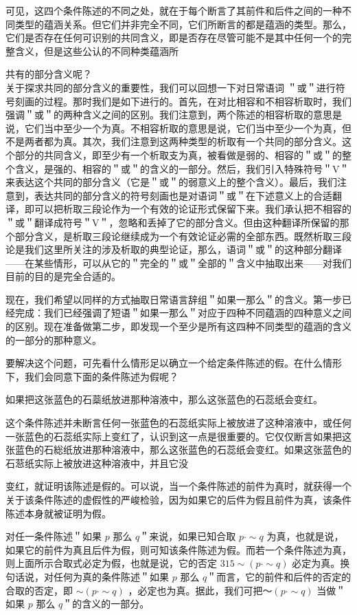 可见，这四个条件陈述的不同之处，就在于每个断言了其前件和后件之间的一种不同类型的蕴涵关系。但它们并非完全不同，它们所断言的都是蕴涵的类型。那么，它们是否存在任何可识别的共同含义，即是否存在尽管可能不是其中任何一个的完整含义，但是这些公认的不同种类蕴涵所

共有的部分含义呢？\\
关于探求共同的部分含义的重要性，我们可以回想一下对日常语词 ＂或＂进行符号刻画的过程。那时我们是如下进行的。首先，在对比相容和不相容析取时，我们强调＂或＂的两种含义之间的区别。我们注意到，两个陈述的相容析取的意思是说，它们当中至少一个为真。不相容析取的意思是说，它们当中至少一个为真，但不是两者都为真。其次，我们注意到这两种类型的析取有一个共同的部分含义。这个部分的共同含义，即至少有一个析取支为真，被看做是弱的、相容的＂或＂的整个含义，是强的、相容的＂或＂的含义的一部分。然后，我们引入特殊符号＂V＂来表达这个共同的部分含义（它是＂或＂的弱意义上的整个含义）。最后，我们注意到，表达共同的部分含义的符号刻画也是对语词＂或＂在下述意义上的合适翻译，即可以把析取三段论作为一个有效的论证形式保留下来。我们承认把不相容的＂或＂翻译成符号＂V＂，忽略和丢掉了它的部分含义。但由这种翻译所保留的那个部分含义，是析取三段论继续成为一个有效论证必需的全部东西。既然析取三段论是我们这里所关注的涉及析取的典型论证，那么，语词＂或＂的这种部分翻译——在某些情形，可以从它的＂完全的＂或＂全部的＂含义中抽取出来——对我们目前的目的是完全合适的。

现在，我们希望以同样的方式抽取日常语言辞组＂如果一那么＂的含义。第一步已经完成：我们已经强调了短语＂如果一那么＂对应于四种不同蕴涵的四种意义之间的区别。现在准备做第二步，即发现一个至少是所有这四种不同类型的蕴涵的含义的一部分的那种意义。

要解决这个问题，可先看什么情形足以确立一个给定条件陈述的假。在什么情形下，我们会同意下面的条件陈述为假呢？

\begin{displayquote}
如果把这张蓝色的石蘂纸放进那种溶液中，那么这张蓝色的石蕊纸会变红。
\end{displayquote}

这个条件陈述并未断言任何一张蓝色的石蕊纸实际上被放进了这种溶液中，或任何一张蓝色的石蕊纸实际上变红了，认识到这一点是很重要的。它仅仅断言如果把这张蓝色的石総纸放进那种溶液中，那么这张蓝色的石蕊纸会变红。如果这张蓝色的石䓗纸实际上被放进这种溶液中，并且它没

变红，就证明该陈述是假的。可以说，当一个条件陈述的前件为真时，就获得一个关于该条件陈述的虚假性的严峻检验，因为如果它的后件为假且前件为真，该条件陈述本身就被证明为假。

对任一条件陈述＂如果 $p$ 那么 $q$＂来说，如果已知合取 $p \cdot \sim q$ 为真，也就是说，如果它的前件为真且后件为假，则可知该条件陈述为假。而若一个条件陈述为真，则上面所示合取式必定为假，也就是说，它的否定 $315 \sim(p \cdot \sim q)$ 必定为真。换句话说，对任何为真的条件陈述＂如果 $p$ 那么 $q$＂而言，它的前件和后件的否定的合取的否定，即 $\sim(p \cdot \sim q)$ ，必定也为真。据此，我们可把～$(p \cdot \sim q)$ 当做＂如果 $p$ 那么 $q$＂的含义的一部分。

